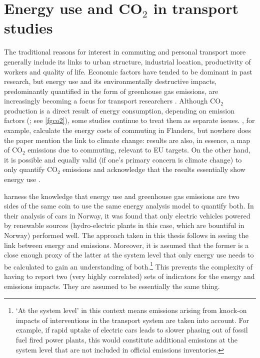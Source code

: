 \section{Energy use and CO$_2$ in transport studies}
\label{s:energy}
The traditional reasons for interest in commuting and  personal transport
more generally include its links to urban structure, industrial location,
productivity of workers and  quality of life. Economic factors have
tended to be dominant in past research,
but energy use and its environmentally destructive impacts,
predominantly quantified in the form of greenhouse gas emissions,
are increasingly becoming a focus for transport researchers \citep{Chapman2007}.
Although CO$_2$ production is a direct result of energy consumption,
depending on emission factors (\citealp{Defra2011}; see \cref{fgco2}), some studies continue to
treat them as separate issues. \citet{Boussauw2009}, for example,
calculate the energy costs of commuting in Flanders, but nowhere does
the paper mention the link to climate change: results are also, in essence,
a map of CO$_2$ emissions due to commuting, relevant to EU targets.
On the other hand,
it is possible and equally valid (if one's primary concern is climate change)
to only quantify CO$_2$ emissions and acknowledge
that the results essentially show energy use \citep{smith2011polycentricity}.

\citet{Simonsen2011} harness the knowledge that energy use
and greenhouse gas emissions are two sides of the same coin to use the
same energy analysis model to quantify both. In their analysis of cars in Norway,
it was found that only electric vehicles powered by renewable
sources (hydro-electric plants in this case, which are bountiful in Norway)
performed well. The approach taken in this thesis follows
\citet{Simonsen2011} in seeing the link
between energy and emissions.
Moreover, it is assumed that the former is a close enough proxy of the latter
at the system level that only energy use needs to be
calculated to gain an understanding of
both.\footnote{`At
the system level'
in this context means emissions arising from knock-on impacts of
interventions in the transport system are taken into account.
For example, if rapid uptake of electric cars leads to slower phasing
out of fossil fuel fired power plants, this would constitute
additional emissions at the system level that are not included in
official emissions inventories.
}
This prevents the complexity of having to report two (very highly correlated)
sets of indicators for the energy and emissions impacts. They are assumed to
be essentially the same thing.


